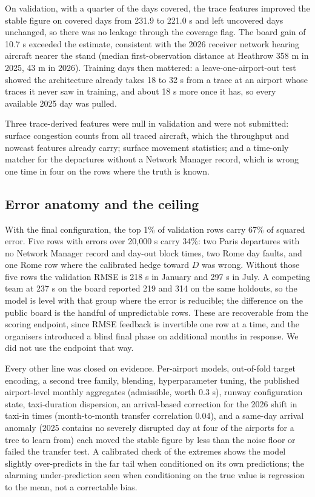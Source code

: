\documentclass[
  manuscript=article,
  layout=preprint,
  year=2027,
  volume=x,
]{extra/joas}
\begin{document}
On validation, with a quarter of the days covered, the trace features improved the stable figure on covered days from 231.9 to 221.0 s and left uncovered days unchanged, so there was no leakage through the coverage flag. The board gain of 10.7 s exceeded the estimate, consistent with the 2026 receiver network hearing aircraft nearer the stand (median first-observation distance at Heathrow 358 m in 2025, 43 m in 2026). Training days then mattered: a leave-one-airport-out test showed the architecture already takes 18 to 32 s from a trace at an airport whose traces it never saw in training, and about 18 s more once it has, so every available 2025 day was pulled.

Three trace-derived features were null in validation and were not submitted: surface congestion counts from all traced aircraft, which the throughput and nowcast features already carry; surface movement statistics; and a time-only matcher for the departures without a Network Manager record, which is wrong one time in four on the rows where the truth is known.

\subsection{Error anatomy and the ceiling}

With the final configuration, the top 1\% of validation rows carry 67\% of squared error. Five rows with errors over 20,000 s carry 34\%: two Paris departures with no Network Manager record and day-out block times, two Rome day faults, and one Rome row where the calibrated hedge toward $D$ was wrong. Without those five rows the validation RMSE is 218 s in January and 297 s in July. A competing team at 237 s on the board reported 219 and 314 on the same holdouts, so the model is level with that group where the error is reducible; the difference on the public board is the handful of unpredictable rows. These are recoverable from the scoring endpoint, since RMSE feedback is invertible one row at a time, and the organisers introduced a blind final phase on additional months in response. We did not use the endpoint that way.

Every other line was closed on evidence. Per-airport models, out-of-fold target encoding, a second tree family, blending, hyperparameter tuning, the published airport-level monthly aggregates (admissible, worth 0.3 s), runway configuration state, taxi-duration dispersion, an arrival-based correction for the 2026 shift in taxi-in times (month-to-month transfer correlation 0.04), and a same-day arrival anomaly (2025 contains no severely disrupted day at four of the airports for a tree to learn from) each moved the stable figure by less than the noise floor or failed the transfer test. A calibrated check of the extremes shows the model slightly over-predicts in the far tail when conditioned on its own predictions; the alarming under-prediction seen when conditioning on the true value is regression to the mean, not a correctable bias.
\end{document}

